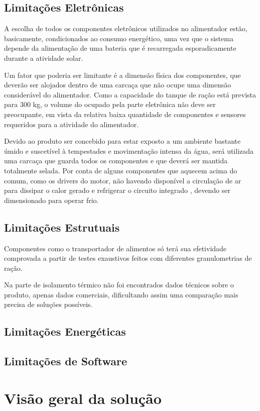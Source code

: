 \subsection{Limitações Eletrônicas}
A escolha de todos os componentes eletrônicos utilizados no alimentador estão, basicamente, condicionados ao consumo energético, uma vez que o sistema depende da alimentação de uma bateria que é recarregada esporadicamente durante a atividade solar.

Um fator que poderia ser limitante é a dimensão física dos componentes, que deverão ser alojados dentro de uma carcaça que não ocupe uma dimensão considerável do alimentador. Como a capacidade do tanque de ração está prevista para 300 kg, o volume do ocupado pela parte eletrônica não deve ser preocupante, em vista da relativa baixa quantidade de componentes e sensores requeridos para a atividade do alimentador.

Devido ao produto ser concebido para estar exposto a um ambiente bastante úmido e suscetível à tempestades e movimentação intensa da água, será utilizada uma carcaça que guarda todos os componentes e que deverá ser mantida totalmente selada. Por conta de alguns componentes que aquecem acima do comum, como os drivers do motor, não havendo disponível a circulação de ar para dissipar o calor gerado e refrigerar o circuito integrado , devendo ser dimensionado para operar frio.

\subsection{Limitações Estrutuais}
Componentes como o transportador de alimentos só terá sua efetividade comprovada a partir de testes exaustivos feitos com diferentes granulometrias de ração.

Na parte de isolamento térmico não foi encontrados dados técnicos sobre o produto, apenas dados comerciais, dificultando assim uma comparação mais precisa de soluções possíveis.

\subsection{Limitações Energéticas}
\subsection{Limitações de Software}

\section{Visão geral da solução}

